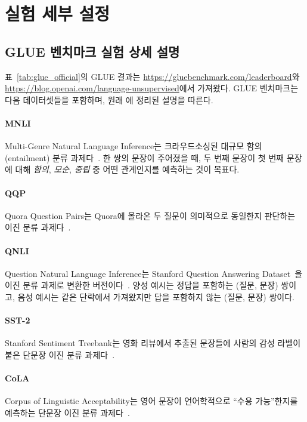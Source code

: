 \section{실험 세부 설정}
\label{appendix:sec:exp_details}

\subsection{GLUE 벤치마크 실험 상세 설명}
\label{appendix:sec:glue}

표~\ref{tab:glue_official}의 GLUE 결과는 \url{https://gluebenchmark.com/leaderboard}와 \url{https://blog.openai.com/language-unsupervised}에서 가져왔다.
GLUE 벤치마크는 다음 데이터셋들을 포함하며, 원래 \citet{wang-etal:2018:_glue}에 정리된 설명을 따른다.

\paragraph{MNLI} Multi-Genre Natural Language Inference는 크라우드소싱된 대규모 함의(entailment) 분류 과제다~\cite{williams-nangia-bowman:2018}. 한 쌍의 문장이 주어졌을 때, 두 번째 문장이 첫 번째 문장에 대해 \emph{함의}, \emph{모순}, \emph{중립} 중 어떤 관계인지를 예측하는 것이 목표다.

\paragraph{QQP} Quora Question Pairs는 Quora에 올라온 두 질문이 의미적으로 동일한지 판단하는 이진 분류 과제다~\cite{chen-etal:2018:_quora}.

\paragraph{QNLI} Question Natural Language Inference는 Stanford Question Answering Dataset~\cite{rajpurkar-etal:2016:_squad}을 이진 분류 과제로 변환한 버전이다~\cite{wang-etal:2018:_glue}. 양성 예시는 정답을 포함하는 (질문, 문장) 쌍이고, 음성 예시는 같은 단락에서 가져왔지만 답을 포함하지 않는 (질문, 문장) 쌍이다.

\paragraph{SST-2} Stanford Sentiment Treebank는 영화 리뷰에서 추출된 문장들에 사람의 감성 라벨이 붙은 단문장 이진 분류 과제다~\cite{socher-etal:2013:_recur}.

\paragraph{CoLA} Corpus of Linguistic Acceptability는 영어 문장이 언어학적으로 ``수용 가능''한지를 예측하는 단문장 이진 분류 과제다~\cite{warstadt-singh-bowman:2018:_corpus}.


